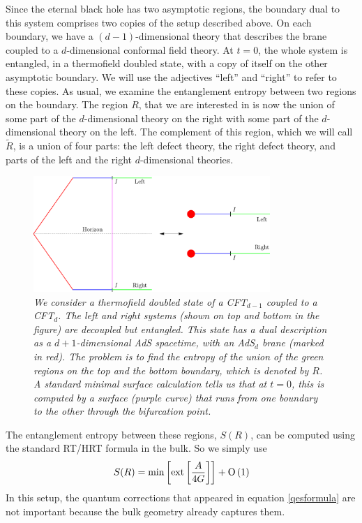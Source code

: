 \documentclass[12pt]{article}
\def\gnewt{G}
\def\Or[#1]{{\text{O}}\left({#1}\right)}
\newcommand{\be}{\begin{equation}}
\newcommand{\ee}{\end{equation}}
\begin{document}
Since the eternal black hole has two asymptotic regions, the boundary dual to this system comprises two copies of the setup described above. On each boundary, we have a $(d-1)$-dimensional theory that describes the brane coupled to a $d$-dimensional conformal field theory. At $t = 0$, the whole system is entangled, in a thermofield doubled state, with a copy of itself on the other asymptotic boundary. We will use the adjectives ``left'' and ``right'' to refer to
these copies. As usual, we examine the entanglement entropy between two regions on the boundary. The region  $R$, that we are interested in is now the union of some part of the $d$-dimensional theory on the right with some part of the $d$-dimensional theory on the left. The complement of this region, which we will call $\widetilde{R}$, is a union of four parts: the left defect theory, the right defect theory,  and parts of the left and the right $d$-dimensional theories.


\begin{figure}[!ht]
\begin{center}
\includegraphics[width=0.8\textwidth]{rsbranesetup.pdf}
\caption{\em We consider a thermofield doubled state of  a CFT$_{d-1}$ coupled to a CFT$_d$. The left and right systems (shown on top and bottom in the figure) are decoupled but entangled. This state has a dual description as a $d+1$-dimensional AdS spacetime,  with an AdS$_d$  brane (marked in red). The problem is to find the entropy of the union of the green regions on the top and the bottom boundary, which is denoted by $R$. A standard minimal surface calculation tells us that at $t = 0$, this is computed by a surface (purple curve) that runs from one boundary to the other through the bifurcation point. \label{rsinit}}
\end{center}
\end{figure}

The entanglement entropy between these regions, $S(R)$, can be computed using the standard RT/HRT formula in the bulk. So we simply use
\be
\label{rtformula}
S(R) = \text{min}\left[ \text{ext} \left[{A \over 4 \gnewt}  \right] \right] + \Or[1]
\ee
In this setup, the quantum corrections that appeared in equation \eqref{qesformula} are not important because the bulk geometry already captures them.
\end{document}
